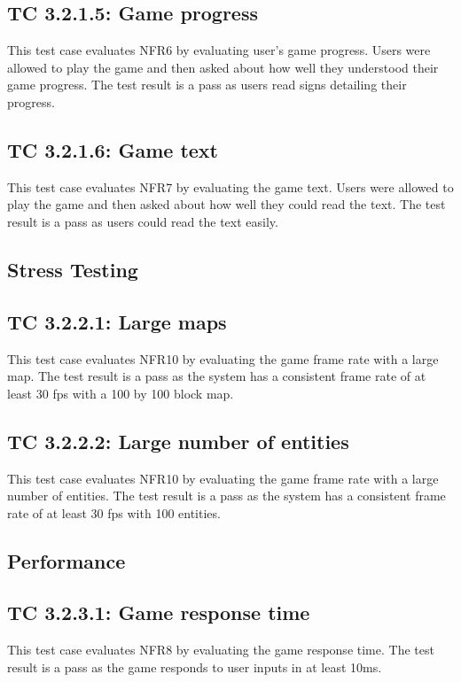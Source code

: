 \documentclass[12pt, titlepage]{article}
\begin{document}
\subsection*{TC 3.2.1.5: Game progress}
This test case evaluates NFR6 by evaluating user's game progress. Users were allowed to play the game and then asked about how well they understood their game progress. The test result is a pass as users read signs detailing their progress.

\subsection*{TC 3.2.1.6: Game text}
This test case evaluates NFR7 by evaluating the game text. Users were allowed to play the game and then asked about how well they could read the text. The test result is a pass as users could read the text easily.

\subsection{Stress Testing}

\subsection*{TC 3.2.2.1: Large maps}
This test case evaluates NFR10 by evaluating the game frame rate with a large map. The test result is a pass as the system has a consistent frame rate of at least 30 fps with a 100 by 100 block map.

\subsection*{TC 3.2.2.2: Large number of entities}
This test case evaluates NFR10 by evaluating the game frame rate with a large number of entities. The test result is a pass as the system has a consistent frame rate of at least 30 fps with 100 entities.
		
\subsection{Performance}

\subsection*{TC 3.2.3.1: Game response time}
This test case evaluates NFR8 by evaluating the game response time. The test result is a pass as the game responds to user inputs in at least 10ms.
\end{document}
